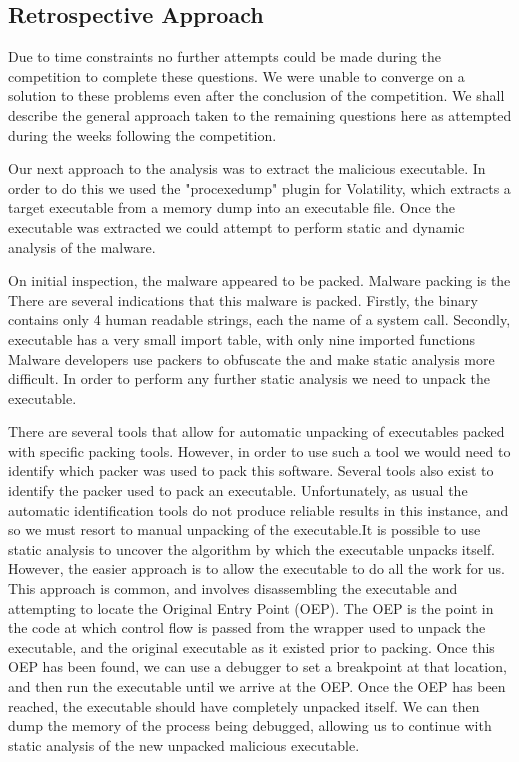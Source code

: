 \subsection{Retrospective Approach}
Due to time constraints no further attempts could be made during the competition to complete these questions. We were unable to converge on a solution to these problems even after the conclusion of the competition. We shall describe the general approach taken to the remaining questions here as attempted during the weeks following the competition.

Our next approach to the analysis was to extract the malicious executable. In order to do this we used the "procexedump" plugin for Volatility, which extracts a target executable from a memory dump into an executable file. Once the executable was extracted we could attempt to perform static and dynamic analysis of the malware.

On initial inspection, the malware appeared to be packed. Malware packing is the There are several indications that this malware is packed. Firstly, the binary contains only 4 human readable strings, each the name of a system call. Secondly, executable has a very small import table, with only nine imported functions \cite[p.13]{pracmal} 
Malware developers use packers to obfuscate the and make static analysis more difficult. In order to perform any further static analysis we need to unpack the executable.

There are several tools that allow for automatic unpacking of executables packed with specific packing tools. However, in order to use such a tool we would need to identify which packer was used to pack this software. Several tools also exist to identify the packer used to pack an executable. Unfortunately, as usual the automatic identification tools do not produce reliable results in this instance, and so we must resort to manual unpacking of the executable.It is possible to use static analysis to uncover the algorithm by which the executable unpacks itself. However, the easier approach is to allow the executable to do all the work for us. This approach is common, and involves disassembling the executable and attempting to locate the Original Entry Point (OEP). The OEP is the point in the code at which control flow is passed from the wrapper used to unpack the executable, and the original executable as it existed prior to packing. Once this OEP has been found, we can use a debugger to set a breakpoint at that location, and then run the executable until we arrive at the OEP. Once the OEP has been reached, the executable should have completely unpacked itself. We can then dump the memory of the process being debugged, allowing us to continue with static analysis of the new unpacked malicious executable.


